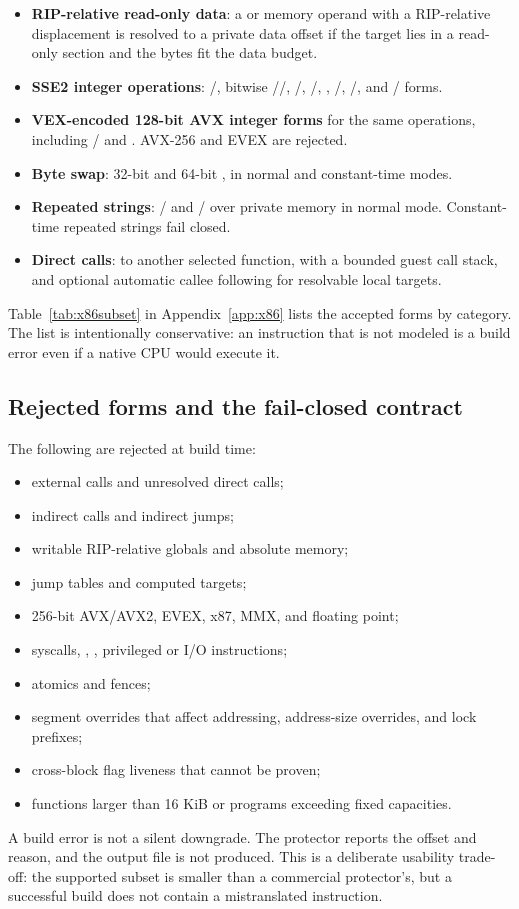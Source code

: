 \begin{itemize}
  \item \textbf{RIP-relative read-only data}: a  or memory operand with
        a RIP-relative displacement is resolved to a private data offset if the
        target lies in a read-only section and the bytes fit the data budget.
  \item \textbf{SSE2 integer operations}: /, bitwise
        //, /,
        /, ,
        /, /, and
        / forms.
  \item \textbf{VEX-encoded 128-bit AVX integer forms} for the same operations,
        including / and . AVX-256 and
        EVEX are rejected.
  \item \textbf{Byte swap}: 32-bit and 64-bit , in normal and
        constant-time modes.
  \item \textbf{Repeated strings}: / and
        / over private memory in normal mode.
        Constant-time repeated strings fail closed.
  \item \textbf{Direct calls}:  to another selected function,
        with a bounded guest call stack, and optional automatic callee following
        for resolvable local targets.
\end{itemize}

Table~\ref{tab:x86subset} in Appendix~\ref{app:x86} lists the accepted forms by
category. The list is intentionally conservative: an instruction that is not
modeled is a build error even if a native CPU would execute it.

\subsection{Rejected forms and the fail-closed contract}

The following are rejected at build time:

\begin{itemize}
  \item external calls and unresolved direct calls;
  \item indirect calls and indirect jumps;
  \item writable RIP-relative globals and absolute memory;
  \item jump tables and computed targets;
  \item 256-bit AVX/AVX2, EVEX, x87, MMX, and floating point;
  \item syscalls, , , privileged or I/O instructions;
  \item atomics and fences;
  \item segment overrides that affect addressing, address-size overrides, and
        lock prefixes;
  \item cross-block flag liveness that cannot be proven;
  \item functions larger than 16 KiB or programs exceeding fixed capacities.
\end{itemize}

A build error is not a silent downgrade. The protector reports the offset and
reason, and the output file is not produced. This is a deliberate usability
trade-off: the supported subset is smaller than a commercial protector's, but a
successful build does not contain a mistranslated instruction.
